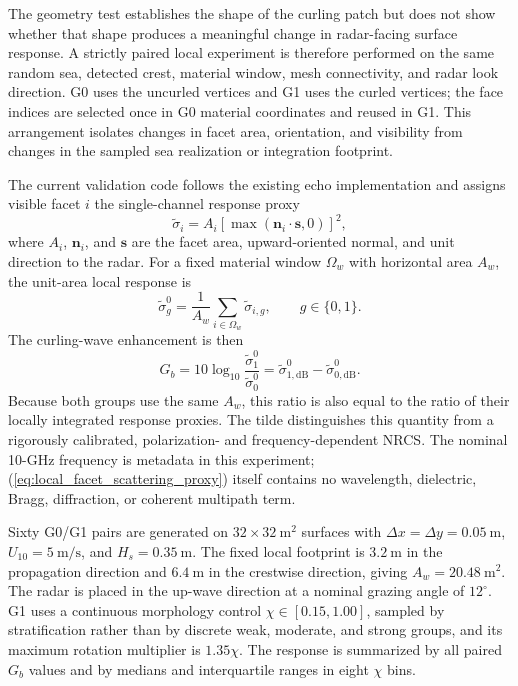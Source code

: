 The geometry test establishes the shape of the curling patch but does not show whether that shape produces a meaningful change in radar-facing surface response. A strictly paired local experiment is therefore performed on the same random sea, detected crest, material window, mesh connectivity, and radar look direction. G0 uses the uncurled vertices and G1 uses the curled vertices; the face indices are selected once in G0 material coordinates and reused in G1. This arrangement isolates changes in facet area, orientation, and visibility from changes in the sampled sea realization or integration footprint.

The current validation code follows the existing echo implementation and assigns visible facet $i$ the single-channel response proxy
\begin{equation}
\widetilde{\sigma}_i=A_i\left[\max\left(\boldsymbol{n}_i\cdot\boldsymbol{s},0\right)\right]^2,
\label{eq:local_facet_scattering_proxy}
\end{equation}
where $A_i$, $\boldsymbol{n}_i$, and $\boldsymbol{s}$ are the facet area, upward-oriented normal, and unit direction to the radar. For a fixed material window $\Omega_w$ with horizontal area $A_w$, the unit-area local response is
\begin{equation}
\widetilde{\sigma}^{0}_{g}=\frac{1}{A_w}\sum_{i\in\Omega_w}\widetilde{\sigma}_{i,g},\qquad g\in\{0,1\}.
\label{eq:unit_area_local_scattering_proxy}
\end{equation}
The curling-wave enhancement is then
\begin{equation}
G_b=10\log_{10}\frac{\widetilde{\sigma}^{0}_{1}}{\widetilde{\sigma}^{0}_{0}}=\widetilde{\sigma}^{0}_{1,\mathrm{dB}}-\widetilde{\sigma}^{0}_{0,\mathrm{dB}}.
\label{eq:local_breaker_scattering_gain}
\end{equation}
Because both groups use the same $A_w$, this ratio is also equal to the ratio of their locally integrated response proxies. The tilde distinguishes this quantity from a rigorously calibrated, polarization- and frequency-dependent NRCS. The nominal 10-GHz frequency is metadata in this experiment; (\ref{eq:local_facet_scattering_proxy}) itself contains no wavelength, dielectric, Bragg, diffraction, or coherent multipath term.

Sixty G0/G1 pairs are generated on $32\times32~\mathrm{m}^2$ surfaces with $\Delta x=\Delta y=0.05~\mathrm{m}$, $U_{10}=5~\mathrm{m/s}$, and $H_s=0.35~\mathrm{m}$. The fixed local footprint is $3.2~\mathrm{m}$ in the propagation direction and $6.4~\mathrm{m}$ in the crestwise direction, giving $A_w=20.48~\mathrm{m}^2$. The radar is placed in the up-wave direction at a nominal grazing angle of $12^{\circ}$. G1 uses a continuous morphology control $\chi\in[0.15,1.00]$, sampled by stratification rather than by discrete weak, moderate, and strong groups, and its maximum rotation multiplier is $1.35\chi$. The response is summarized by all paired $G_b$ values and by medians and interquartile ranges in eight $\chi$ bins.

